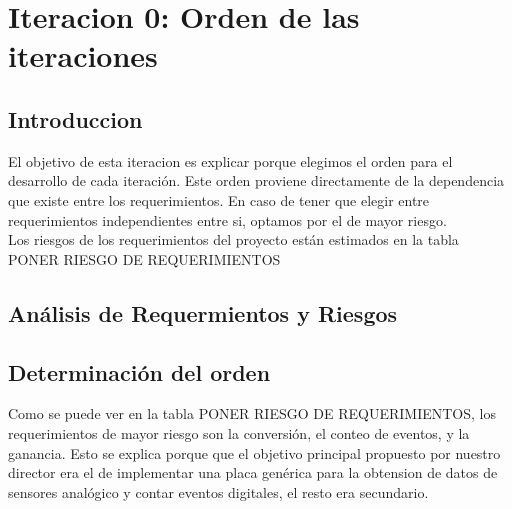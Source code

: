 \chapter{Iteracion 0: Orden de las iteraciones} %
\label{cha:iteracion_0}

\section{Introduccion} %
\label{it0:sec:introduccion}

El objetivo de esta iteracion es explicar porque elegimos el orden para el desarrollo de cada iteración. Este orden proviene directamente de la dependencia que existe entre los requerimientos. En caso de tener que elegir entre requerimientos independientes entre si, optamos por el de mayor riesgo. \\

Los riesgos de los requerimientos del proyecto están estimados en la tabla PONER RIESGO DE REQUERIMIENTOS



\section{Análisis de Requermientos y Riesgos} %
\label{it0:sec:analisis_de_requermientos_y_riesgos}





\section{Determinación del orden} %
\label{it0:sec:determinacion_del_orden}

Como se puede ver en la tabla PONER RIESGO DE REQUERIMIENTOS, los requerimientos de mayor riesgo son la conversión, el conteo de eventos, y la ganancia. Esto se explica porque que el objetivo principal propuesto por nuestro director era el de implementar una placa genérica para la obtension de datos de sensores analógico y contar eventos digitales, el resto era secundario. \\

